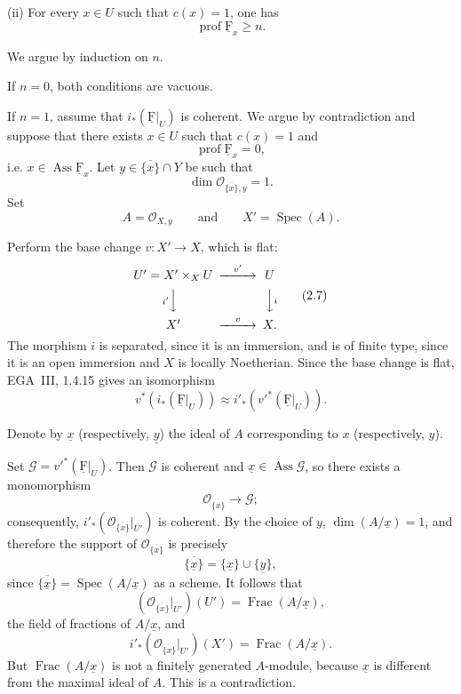 \documentclass[10pt,a4paper]{article}
\newcommand{\uF}{\underline{\mathrm F}}
\newcommand{\cF}{\uF}
\newcommand{\cG}{\mathcal G}
\newcommand{\cO}{\mathcal O}
\newcommand{\Ass}{\operatorname{Ass}}
\newcommand{\Frac}{\operatorname{Frac}}
\newcommand{\Spec}{\operatorname{Spec}}
\newcommand{\prof}{\operatorname{prof}}
\theoremstyle{sgatheorem}
\theoremstyle{plain}
\numberwithin{equation}{section}
\begin{document}
\medskip
\noindent\textup{(ii)} For every $x\in U$ such that $c(x)=1$, one has
\[
  \operatorname{prof}\cF_x\geq n.
\]

\noindent We argue by induction on $n$.

\medskip
\noindent If $n=0$, both conditions are vacuous.


\medskip
\noindent If $n=1$, assume that $i_*(\cF|_U)$ is coherent. We argue by
contradiction and suppose that there exists $x\in U$ such that $c(x)=1$ and
\[
  \prof\cF_x=0,
\]
i.e. $x\in\Ass\cF_x$. Let $y\in\overline{\{x\}}\cap Y$ be such that
\[
  \dim\cO_{\overline{\{x\}},y}=1.
\]
Set
\[
  A=\cO_{X,y}\qquad\text{and}\qquad X'=\Spec(A).
\]

\setcounter{equation}{6}
\noindent Perform the base change $v\colon X'\longrightarrow X$, which is
flat:
\begin{equation}
\begin{CD}
U'=X'\times_X U @>{v'}>> U\\
@V{i'}VV @VV{i}V\\
X' @>{v}>> X .
\end{CD}
\tag{2.7}\label{eq:VIII.2.7}
\end{equation}
The morphism $i$ is separated, since it is an immersion, and is of finite
type, since it is an open immersion and $X$ is locally Noetherian. Since the
base change is flat, EGA~III, 1.4.15 gives an isomorphism
\begin{equation}
  v^*(i_*(\cF|_U))
  \approx
  i'_*(v'^*(\cF|_U)).
\tag{2.8}\label{eq:VIII.2.8}
\end{equation}

\quad Denote by
$\underline{x}$ (respectively, $\underline{y}$) the ideal of $A$
corresponding to $x$ (respectively, $y$).

\medskip
\noindent Set $\cG=v'^*(\cF|_U)$. Then $\cG$ is coherent and
$\underline{x}\in\Ass\cG$, so there exists a monomorphism
\[
  \cO_{\overline{\{x\}}}\longrightarrow\cG;
\]
consequently, $i'_*(\cO_{\overline{\{x\}}}|_{U'})$ is coherent. By the choice
of $y$, $\dim(A/\underline{x})=1$, and therefore the support of
$\cO_{\overline{\{x\}}}$ is precisely
\[
  \overline{\{\underline{x}\}}
  =\{\underline{x}\}\cup\{\underline{y}\},
\]
since $\overline{\{\underline{x}\}}=\Spec(A/\underline{x})$ as a scheme. It
follows that
\[
  (\cO_{\overline{\{x\}}}|_{U'})(U')
  =\Frac(A/\underline{x}),
\]
the field of fractions of $A/\underline{x}$, and
\[
  i'_*(\cO_{\overline{\{x\}}}|_{U'})(X')
  =\Frac(A/\underline{x}).
\]
But $\Frac(A/\underline{x})$ is not a finitely generated $A$-module, because
$\underline{x}$ is different from the maximal ideal of $A$. This is a
contradiction.
\end{document}
